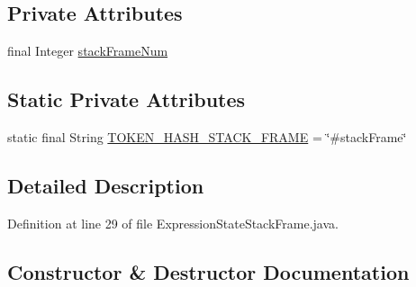 \subsection*{Private Attributes}
\begin{DoxyCompactItemize}
\item 
final Integer \hyperlink{classgov_1_1nasa_1_1jpf_1_1inspector_1_1server_1_1expression_1_1expressions_1_1_expression_state_stack_frame_a8d86ca98d313121576886938dba7c40a}{stack\+Frame\+Num}
\end{DoxyCompactItemize}
\subsection*{Static Private Attributes}
\begin{DoxyCompactItemize}
\item 
static final String \hyperlink{classgov_1_1nasa_1_1jpf_1_1inspector_1_1server_1_1expression_1_1expressions_1_1_expression_state_stack_frame_abff298afbd878c93c5d648cc32338bcb}{T\+O\+K\+E\+N\+\_\+\+H\+A\+S\+H\+\_\+\+S\+T\+A\+C\+K\+\_\+\+F\+R\+A\+ME} = \char`\"{}\#stack\+Frame\char`\"{}
\end{DoxyCompactItemize}


\subsection{Detailed Description}


Definition at line 29 of file Expression\+State\+Stack\+Frame.\+java.



\subsection{Constructor \& Destructor Documentation}
